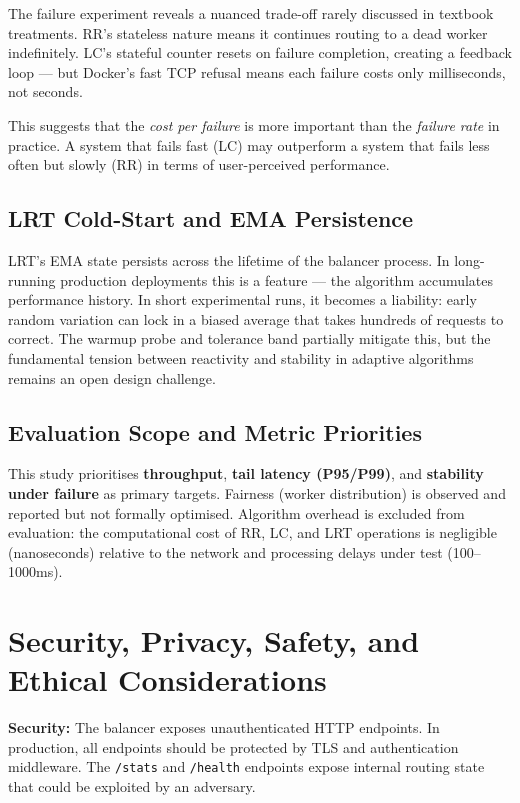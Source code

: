 \documentclass[conference]{IEEEtran}
\begin{document}
The failure experiment reveals a nuanced trade-off rarely discussed in textbook treatments. RR's stateless nature means it continues routing to a dead worker indefinitely. LC's stateful counter resets on failure completion, creating a feedback loop --- but Docker's fast TCP refusal means each failure costs only milliseconds, not seconds.

This suggests that the \textit{cost per failure} is more important than the \textit{failure rate} in practice. A system that fails fast (LC) may outperform a system that fails less often but slowly (RR) in terms of user-perceived performance.

\subsection{LRT Cold-Start and EMA Persistence}

LRT's EMA state persists across the lifetime of the balancer process. In long-running production deployments this is a feature --- the algorithm accumulates performance history. In short experimental runs, it becomes a liability: early random variation can lock in a biased average that takes hundreds of requests to correct. The warmup probe and tolerance band partially mitigate this, but the fundamental tension between reactivity and stability in adaptive algorithms remains an open design challenge.

\subsection{Evaluation Scope and Metric Priorities}

This study prioritises \textbf{throughput}, \textbf{tail latency (P95/P99)}, and \textbf{stability under failure} as primary targets. Fairness (worker distribution) is observed and reported but not formally optimised. Algorithm overhead is excluded from evaluation: the computational cost of RR, LC, and LRT operations is negligible (nanoseconds) relative to the network and processing delays under test (100--1000ms).

\section{Security, Privacy, Safety, and Ethical Considerations}

\textbf{Security:} The balancer exposes unauthenticated HTTP endpoints. In production, all endpoints should be protected by TLS and authentication middleware. The \texttt{/stats} and \texttt{/health} endpoints expose internal routing state that could be exploited by an adversary.
\end{document}
